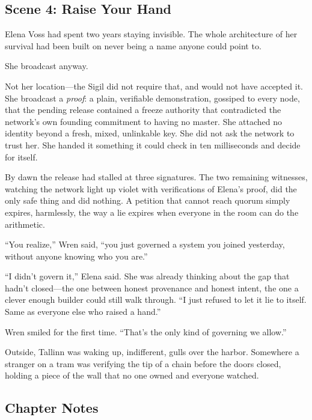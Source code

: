 \documentclass[12pt,letterpaper]{book}
\begin{document}
\hypertarget{scene-4-raise-your-hand}{%
\subsection{Scene 4: Raise Your
Hand}\label{scene-4-raise-your-hand}}

Elena Voss had spent two years staying invisible. The whole architecture of her
survival had been built on never being a name anyone could point to.

She broadcast anyway.

Not her location---the Sigil did not require that, and would not have accepted
it. She broadcast a \emph{proof}: a plain, verifiable demonstration, gossiped to
every node, that the pending release contained a freeze authority that
contradicted the network's own founding commitment to having no master. She
attached no identity beyond a fresh, mixed, unlinkable key. She did not ask the
network to trust her. She handed it something it could check in ten
milliseconds and decide for itself.

By dawn the release had stalled at three signatures. The two remaining
witnesses, watching the network light up violet with verifications of Elena's
proof, did the only safe thing and did nothing. A petition that cannot reach
quorum simply expires, harmlessly, the way a lie expires when everyone in the
room can do the arithmetic.

``You realize,'' Wren said, ``you just governed a system you joined yesterday,
without anyone knowing who you are.''

``I didn't govern it,'' Elena said. She was already thinking about the gap that
hadn't closed---the one between honest provenance and honest intent, the one a
clever enough builder could still walk through. ``I just refused to let it lie
to itself. Same as everyone else who raised a hand.''

Wren smiled for the first time. ``That's the only kind of governing we allow.''

Outside, Tallinn was waking up, indifferent, gulls over the harbor. Somewhere a
stranger on a tram was verifying the tip of a chain before the doors closed,
holding a piece of the wall that no one owned and everyone watched.

\hypertarget{chapter-7-notes}{%
\subsection{Chapter Notes}\label{chapter-7-notes}}
\end{document}
